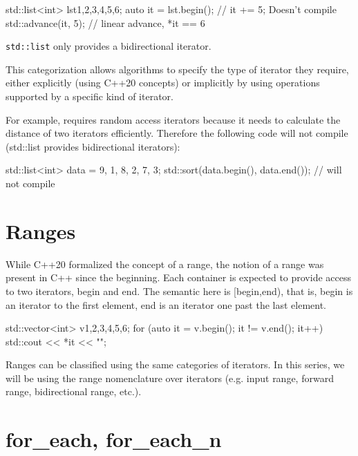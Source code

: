 \begin{box-note}
\begin{cppcode}
std::list<int> lst{1,2,3,4,5,6};
auto it = lst.begin();
// it += 5; Doesn't compile
std::advance(it, 5); // linear advance, *it == 6
\end{cppcode}
\noindent\small\texttt{std::list} only provides a bidirectional iterator.
\end{box-note}

This categorization allows algorithms to specify the type of iterator they require, either explicitly (using C++20 concepts) or implicitly by using operations supported by a specific kind of iterator.

For example, \emph{} requires random access iterators because it needs to calculate the distance of two iterators efficiently. Therefore the following code will not compile (std::list provides bidirectional iterators):

\begin{box-note}
\begin{cppcode}
std::list<int> data = { 9, 1, 8, 2, 7, 3};
std::sort(data.begin(), data.end()); // will not compile
\end{cppcode}
\end{box-note}

\section{Ranges}

While C++20 formalized the concept of a range, the notion of a range was present in C++ since the beginning. Each container is expected to provide access to two iterators, begin and end. The semantic here is [begin,end), that is, begin is an iterator to the first element, end is an iterator one past the last element.

\begin{box-note}
\begin{cppcode}
std::vector<int> v{1,2,3,4,5,6};
for (auto it = v.begin(); it != v.end(); it++) {
    std::cout << *it << "\n";
}
\end{cppcode}
\end{box-note}

Ranges can be classified using the same categories of iterators. In this series, we will be using the range nomenclature over iterators (e.g. input range, forward range, bidirectional range, etc.).

\section{for\_each, for\_each\_n}

